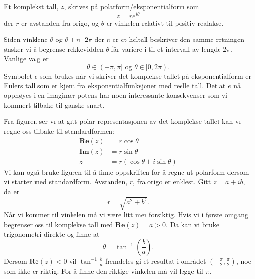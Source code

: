 \documentclass[a4paper,norsk,12pt]{article}
\begin{document}
\begin{tdef}
Et komplekst tall, $z$, skrives på polarform/eksponentialform som 
\begin{displaymath}
	z = re^{i\theta}
\end{displaymath}
der $r$ er avstanden fra origo, og $\theta$ er vinkelen relativt til positiv realakse. 
\end{tdef}
\noindent
Siden vinklene $\theta$ og $\theta+n\cdot 2\pi$ der $n$ er et heltall beskriver den samme retningen ønsker vi å begrense rekkevidden $\theta$ får variere i til et intervall av lengde $2\pi$. Vanlige valg er
\begin{displaymath}
	\theta \in (-\pi, \pi] \text{ og } \theta \in [0, 2\pi).
\end{displaymath}
Symbolet $e$ som brukes når vi skriver det komplekse tallet på eksponentialform er Eulers tall som er kjent fra eksponentialfunksjoner med reelle tall. Det at $e$ nå opphøyes i en imaginær potens har noen interessante konsekvenser som vi kommert tilbake til ganske snart.

Fra figuren ser vi at gitt polar-representasjonen av det komplekse tallet kan vi regne oss tilbake til standardformen:
\begin{align*}
	\mathbf{Re}(z) &= r\cos\theta \\
	\mathbf{Im}(z) &= r\sin\theta \\
	z &= r(\cos\theta + i\sin\theta) 
\end{align*}
Vi kan også bruke figuren til å finne oppskriften for å regne ut polarform dersom vi starter med standardform. Avstanden, $r$, fra origo er enklest. Gitt $z=a + ib$, da er
\begin{displaymath}
	r = \sqrt{a^2 + b^2}.
\end{displaymath}
Når vi kommer til vinkelen må vi være litt mer forsiktig. Hvis vi i første omgang begrenser oss til komplekse tall med $\mathbf{Re}(z)=a>0$. Da kan vi bruke trigonometri direkte og finne at
\begin{displaymath}
	\theta = \tan^{-1}\left(\frac{b}{a}\right).
\end{displaymath}
Dersom $\mathbf{Re}(z)<0$ vil $\tan^{-1}\frac{b}{a}$ fremdeles gi et resultat i området $\left(-\frac{\pi}{2},\frac{\pi}{2}\right)$, noe som ikke er riktig. For å finne den riktige vinkelen må vil legge til $\pi$.
\end{document}
